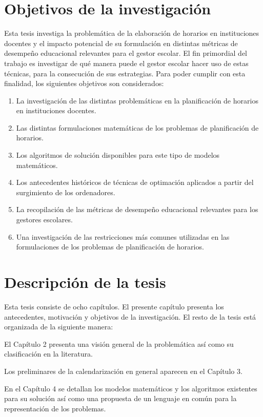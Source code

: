 \documentclass[draft,12pt,headsepline,footsepline,paper=letter]{scrreprt}
\begin{document}
\section{Objetivos de la investigación}

Esta tesis investiga la problemática de la elaboración de horarios en instituciones docentes y el impacto potencial de su formulación en distintas métricas de desempeño educacional relevantes para el gestor escolar. 
El fin primordial del trabajo es investigar de qué manera puede el gestor escolar hacer uso de estas técnicas, para la consecución de sus estrategias.
Para poder cumplir con esta finalidad, los siguientes objetivos son considerados:
\begin{enumerate}[1]
\item La investigación de las distintas problemáticas en la planificación de horarios en instituciones docentes.
\item Las distintas formulaciones matemáticas de los problemas de planificación de horarios.
\item Los algoritmos de solución disponibles para este tipo de modelos matemáticos.
\item Los antecedentes históricos de técnicas de optimación aplicados a partir del surgimiento de los ordenadores.
\item La recopilación de las métricas de desempeño educacional relevantes para los gestores escolares.
\item Una investigación de las restricciones más comunes utilizadas en las formulaciones de los problemas de planificación de horarios.
\end{enumerate}

\section{Descripción de la tesis}

Esta tesis consiste de ocho capítulos. El presente capítulo presenta los antecedentes, motivación y objetivos de la investigación. El resto de la tesis está organizada de la siguiente manera:

El Capítulo 2 presenta una visión general de la problemática así como su clasificación en la literatura.

Los preliminares de la calendarización en general aparecen en el Capítulo 3.

En el Capítulo 4 se detallan los modelos matemáticos y los algoritmos existentes para su solución así como una propuesta de un lenguaje en común para la representación de los problemas.
\end{document}
